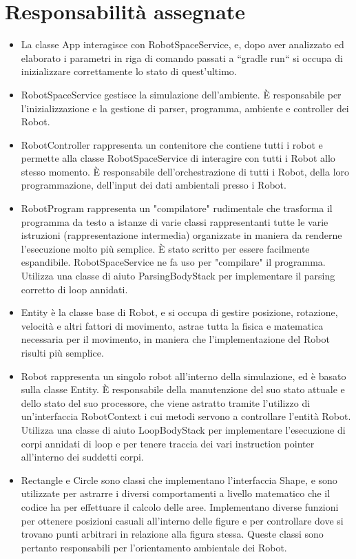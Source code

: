 \documentclass[12pt]{article}
\begin{document}
    \section{Responsabilità assegnate}
    \begin{itemize}
        \item La classe App interagisce con RobotSpaceService, e, dopo aver analizzato ed elaborato i parametri in riga di comando passati a ``gradle run`` si occupa di inizializzare correttamente lo stato di quest'ultimo.
        \item RobotSpaceService gestisce la simulazione dell'ambiente. È responsabile per l'inizializzazione e la gestione di parser, programma, ambiente e controller dei Robot.
        \item RobotController rappresenta un contenitore che contiene tutti i robot e permette alla classe RobotSpaceService di interagire con tutti i Robot allo stesso momento. È responsabile dell'orchestrazione di tutti i Robot, della loro programmazione, dell'input dei dati ambientali presso i Robot.
        \item RobotProgram rappresenta un "compilatore" rudimentale che trasforma il programma da testo a istanze di varie classi rappresentanti tutte le varie istruzioni (rappresentazione intermedia) organizzate in maniera da renderne l'esecuzione molto più semplice. È stato scritto per essere facilmente espandibile. RobotSpaceService ne fa uso per "compilare" il programma. Utilizza una classe di aiuto ParsingBodyStack per implementare il parsing corretto di loop annidati.
        \item Entity è la classe base di Robot, e si occupa di gestire posizione, rotazione, velocità e altri fattori di movimento, astrae tutta la fisica e matematica necessaria per il movimento, in maniera che l'implementazione del Robot risulti più semplice.
        \item Robot rappresenta un singolo robot all'interno della simulazione, ed è basato sulla classe Entity. È responsabile della manutenzione del suo stato attuale e dello stato del suo processore, che viene astratto tramite l'utilizzo di un'interfaccia RobotContext i cui metodi servono a controllare l'entità Robot. Utilizza una classe di aiuto LoopBodyStack per implementare l'esecuzione di corpi annidati di loop e per tenere traccia dei vari instruction pointer all'interno dei suddetti corpi.
        \item Rectangle e Circle sono classi che implementano l'interfaccia Shape, e sono utilizzate per astrarre i diversi comportamenti a livello matematico che il codice ha per effettuare il calcolo delle aree. Implementano diverse funzioni per ottenere posizioni casuali all'interno delle figure e per controllare dove si trovano punti arbitrari in relazione alla figura stessa. Queste classi sono pertanto responsabili per l'orientamento ambientale dei Robot.
    \end{itemize}
\end{document}
